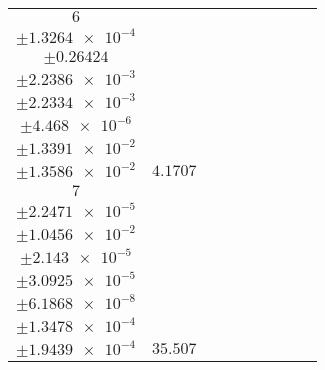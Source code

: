 \documentclass[8pt]{article}
\begin{document}
\begin{longtable}[l]{c c c c c c c c c}
$\num{6}$ & \begin{tabular}[c]{@{}c@{}}$\num{2.9729e-2}$ \\ $\pm\num{1.3264e-4}$\end{tabular} & \begin{tabular}[c]{@{}c@{}}$\num{-1.6143e-2}$ \\ $\pm\num{0.26424}$\end{tabular} & \begin{tabular}[c]{@{}c@{}}$\num{9.0769}$ \\ $\pm\num{2.2386e-3}$\end{tabular} & \begin{tabular}[c]{@{}c@{}}$\num{1.8666e+3}$ \\ $\pm\num{2.2334e-3}$\end{tabular} & \begin{tabular}[c]{@{}c@{}}$\num{3.7343}$ \\ $\pm\num{4.468e-6}$\end{tabular} & \begin{tabular}[c]{@{}c@{}}$\num{3.1421}$ \\ $\pm\num{1.3391e-2}$\end{tabular} & \begin{tabular}[c]{@{}c@{}}$\num{3.1567}$ \\ $\pm\num{1.3586e-2}$\end{tabular} & $\num{4.1707}$\\
$\num{7}$ & \begin{tabular}[c]{@{}c@{}}$\num{0.12291}$ \\ $\pm\num{2.2471e-5}$\end{tabular} & \begin{tabular}[c]{@{}c@{}}$\num{0.36213}$ \\ $\pm\num{1.0456e-2}$\end{tabular} & \begin{tabular}[c]{@{}c@{}}$\num{-5.2045}$ \\ $\pm\num{2.143e-5}$\end{tabular} & \begin{tabular}[c]{@{}c@{}}$\num{1.9242e+3}$ \\ $\pm\num{3.0925e-5}$\end{tabular} & \begin{tabular}[c]{@{}c@{}}$\num{3.8495}$ \\ $\pm\num{6.1868e-8}$\end{tabular} & \begin{tabular}[c]{@{}c@{}}$\num{0.47351}$ \\ $\pm\num{1.3478e-4}$\end{tabular} & \begin{tabular}[c]{@{}c@{}}$\num{0.47377}$ \\ $\pm\num{1.9439e-4}$\end{tabular} & $\num{35.507}$\\

\end{longtable}
\end{document}
